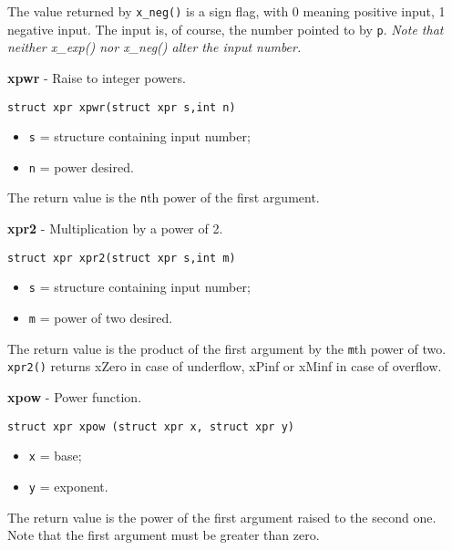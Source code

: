 \documentclass{article}
\begin{document}
The value returned by \texttt{x\_neg()} is a sign flag, with
0 meaning positive input, 1 negative input. The input
is, of course, the number pointed to by \texttt{p}. \textit{Note that}
\textit{neither x\_exp() nor x\_neg() alter the input number.}


\hrulefill{}

\textbf{xpwr} - Raise to integer powers.

\begin{verbatim}
struct xpr xpwr(struct xpr s,int n)
\end{verbatim}

\begin{itemize}
\item \texttt{s} = structure containing input number;
\item \texttt{n} = power desired.
\end{itemize}

The return value is the \texttt{n}th power of the first argument.


\hrulefill{}

\textbf{xpr2} - Multiplication by a power of 2.

\begin{verbatim}
struct xpr xpr2(struct xpr s,int m)
\end{verbatim}

\begin{itemize}
\item \texttt{s} = structure containing input number;
\item \texttt{m} = power of two desired.
\end{itemize}

The return value is the product of
the first argument by the \texttt{m}th power of two.
\texttt{xpr2()} returns xZero in case of underflow, xPinf or
xMinf in case of overflow.


\hrulefill{}

\textbf{xpow} - Power function.

\begin{verbatim}
struct xpr xpow (struct xpr x, struct xpr y)
\end{verbatim}

\begin{itemize}
\item \texttt{x} = base;
\item \texttt{y} = exponent.
\end{itemize}

The return value is the
power of the first argument raised to the second one.
Note that the first argument must be greater than zero.
\end{document}
